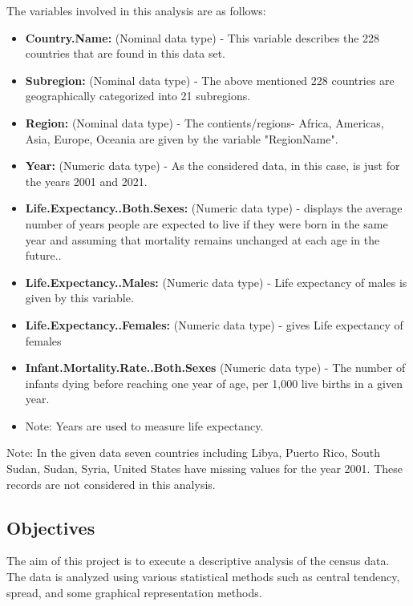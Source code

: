 \documentclass[12 pt]{scrartcl}
\begin{document}
	The variables involved in this analysis are as follows:
	\begin{itemize}
		\item \textbf{Country.Name:} (Nominal data type) - This variable describes the 228 countries that are found in this data set. 
		
		\item \textbf{Subregion:} (Nominal data type) - The above mentioned 228 countries are geographically categorized into 21 subregions.
		
		\item \textbf{Region:} (Nominal data type) - The  contients/regions- Africa, Americas, Asia, Europe,	Oceania are given by the variable "RegionName".  
		
		\item \textbf{Year:} (Numeric data type) - As the considered data, in this case, is just for the years 2001 and 2021.
		
		\item \textbf{Life.Expectancy..Both.Sexes:} (Numeric data type) - displays the average number of years people are expected to live if they were born in the same year and assuming that mortality remains unchanged at each age in the future..
		
		\item \textbf{Life.Expectancy..Males:} (Numeric data type) - Life expectancy of males is given by this variable.
		
		\item \textbf{Life.Expectancy..Females:} (Numeric data type) - gives Life expectancy of females
		
		\item \textbf{Infant.Mortality.Rate..Both.Sexes} (Numeric data type) - The number of infants dying before reaching one year of age, per 1,000 live births in a given year.
		
		\item Note: Years are used to measure life expectancy.
		
	\end{itemize}
	
	Note: In the given data seven countries including Libya, Puerto Rico, South Sudan, Sudan, Syria, United States have missing values for the year 2001. These records are not considered in this analysis.
	
	
	
	\subsection{Objectives}
	The aim of this project is to execute a descriptive analysis of the census data. The data is analyzed using various statistical methods such as central tendency, spread, and some graphical representation methods. 
	
\end{document}
